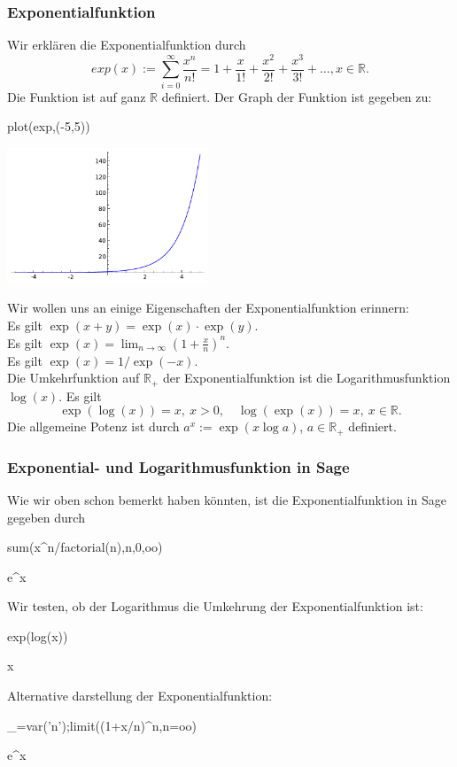 \documentclass[fontsize=12pt,paper=a4,twoside,bibtotoc,idxtotoc,
liststotoc,pagesize,BCOR1.2cm,DIV15,chapterprefix,pagesize=pdftex]{scrbook}
\theoremstyle{plain}
\theoremstyle{definition}
\theoremstyle{remark}
\begin{document}
\subsubsection{Exponentialfunktion}
Wir erklären die Exponentialfunktion durch
\[  exp(x) := \sum_{i=0}^\infty \frac{x^n}{n!}= 1 + \frac{x}{1!} +
\frac{x^2}{2!}+ \frac{x^3}{3!}+ \dots, x \in \mathbb{R}. \]
Die Funktion ist auf ganz $\mathbb{R}$ definiert. Der Graph der Funktion ist gegeben zu:
\begin{sagein}
plot(exp,(-5,5))
\end{sagein}
\begin{center}
\includegraphics[width=6cm]{fexp.pdf}
\end{center}
Wir wollen uns an einige Eigenschaften der Exponentialfunktion erinnern:\\
Es gilt $\exp(x+y)=\exp(x) \cdot \exp(y)$.\\
Es gilt $\exp(x)=\lim_{n \rightarrow \infty} (1+\frac{x}{n})^n$.\\
Es gilt $\exp(x)=1/\exp(-x)$.\\
Die Umkehrfunktion auf $\mathbb{R}_+$ der Exponentialfunktion ist die
 Logarithmusfunktion $\log (x)$. Es gilt
\[ \exp(\log(x))=x, \ x >0, \quad \log ( \exp ( x ))=x, \ x \in \mathbb{R}.\] 
 Die allgemeine Potenz ist durch $a^x:=\exp( x \log a)$,
$a\in \mathbb{R}_+$
definiert. 
\subsubsection{Exponential- und Logarithmusfunktion in Sage}
Wie wir oben schon bemerkt haben könnten, ist die Exponentialfunktion in Sage gegeben durch
\begin{sagein}
sum(x^n/factorial(n),n,0,oo)
\end{sagein}
\begin{sageout}
  e^x
\end{sageout}
Wir testen, ob der Logarithmus die Umkehrung der Exponentialfunktion ist:
\begin{sagein}
exp(log(x))
\end{sagein}
\begin{sageout}
  x
\end{sageout}
Alternative darstellung der Exponentialfunktion:
\begin{sagein}
_=var('n');limit((1+x/n)^n,n=oo)
\end{sagein}
\begin{sageout}
  e^x
\end{sageout}
%   
\end{document}
